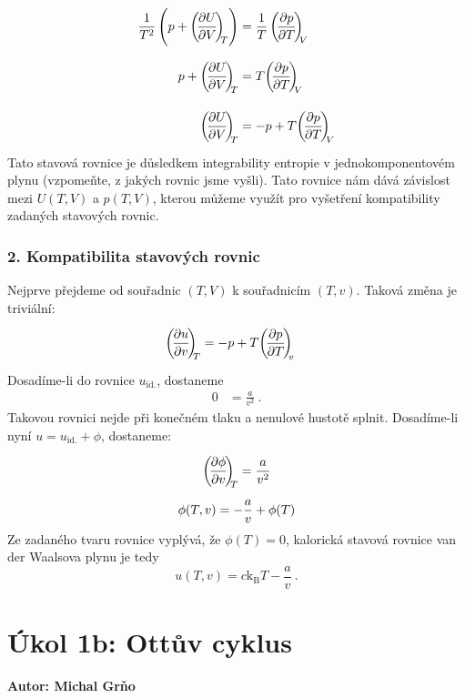 \documentclass{article}
\def\vph{\vphantom}
\newcommand{\const}[1]{\text{#1}}
\newcommand{\pd}[2]{\frac{\partial  #1}{\partial  #2}}
\newcommand{\Pd}[3]{
    \vph{\Bigg|}
    \bigg(
        \hspace{-2pt}
        \pd{#1}{#2}
        \hspace{-2pt}
    \bigg)_{
        \hspace{-3pt} #3
    }
}
\def\kB{\const{k}_\const{B}}
\begin{document}
\begin{align*}
    \frac{1}{T^2} \left( p + \Pd{U}{V}{T} \right) &=
    \frac{1}{T} \, \Pd{p}{T}{V}
    \\[5pt]
    p + \Pd{U}{V}{T} &=
    T \Pd{p}{T}{V}
    \\[5pt]
    \Pd{U}{V}{T} &=
    -p + T \Pd{p}{T}{V}
\end{align*}
Tato stavová rovnice je důsledkem integrability entropie v jednokomponentovém plynu (vzpomeňte, z jakých rovnic jsme vyšli). Tato rovnice nám dává závislost mezi $U(T, V)$ a $p(T, V)$, kterou můžeme využít pro vyšetření kompatibility zadaných stavových rovnic.

\subsubsection*{2. Kompatibilita stavových rovnic}
Nejprve přejdeme od souřadnic $(T, V)$ k souřadnicím $(T, v)$. Taková změna je triviální:
\begin{align*}
    \Pd{u}{v}{T} &=
    -p + T \Pd{p}{T}{v}
\end{align*}
Dosadíme-li do rovnice $u_\const{id.}$, dostaneme
\begin{align*}
    0 &= \frac{a}{v^2} \: .
\end{align*}
Takovou rovnici nejde při konečném tlaku a nenulové hustotě splnit. Dosadíme-li nyní $u = u_\const{id.} + \phi$, dostaneme:
\begin{gather*}
    \Pd{\phi}{v}{T} = \frac{a}{v^2}
    \\[3pt]
    \phi(T, v) = -\frac{a}{v} + \phi(T)
\end{gather*}
Ze zadaného tvaru rovnice vyplývá, že $\phi(T)=0$, kalorická stavová rovnice van der Waalsova plynu je tedy
\begin{equation*}
    u(T,v) = c \kB T - \frac{a}{v} \: .
\end{equation*}

\pagebreak

\section*{Úkol 1b: Ottův cyklus}
\textbf{Autor: Michal Grňo}
\end{document}
